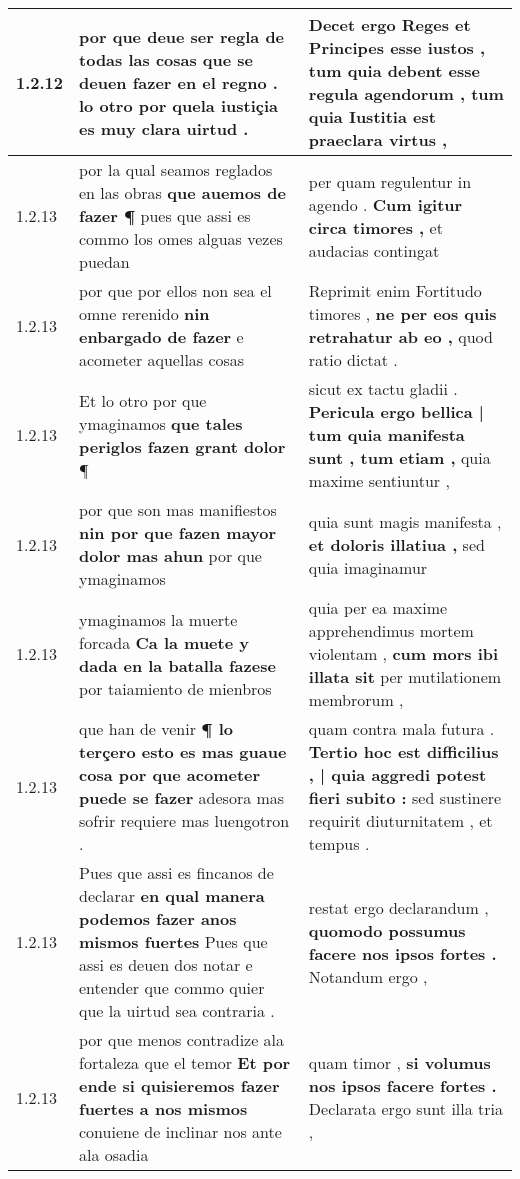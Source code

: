 \begin{tabular}{|p{1cm}|p{6.5cm}|p{6.5cm}|}
1.2.12 & por que deue ser regla de todas las cosas \textbf{ que se deuen fazer en el regno . } lo otro por quela iustiçia es muy clara uirtud . & Decet ergo Reges et Principes esse iustos , \textbf{ tum quia debent esse regula agendorum , } tum quia Iustitia est praeclara virtus , \\\hline
1.2.13 & por la qual seamos reglados en las obras \textbf{ que auemos de fazer ¶ } pues que assi es commo los omes alguas vezes puedan & per quam regulentur in agendo . \textbf{ Cum igitur circa timores , } et audacias contingat \\\hline
1.2.13 & por que por ellos non sea el omne rerenido \textbf{ nin enbargado de fazer } e acometer aquellas cosas & Reprimit enim Fortitudo timores , \textbf{ ne per eos quis retrahatur ab eo , } quod ratio dictat . \\\hline
1.2.13 & Et lo otro por que ymaginamos \textbf{ que tales periglos fazen grant dolor } ¶ & sicut ex tactu gladii . \textbf{ Pericula ergo bellica | tum quia manifesta sunt , tum etiam , } quia maxime sentiuntur , \\\hline
1.2.13 & por que son mas manifiestos \textbf{ nin por que fazen mayor dolor mas ahun } por que ymaginamos & quia sunt magis manifesta , \textbf{ et doloris illatiua , } sed quia imaginamur \\\hline
1.2.13 & ymaginamos la muerte forcada \textbf{ Ca la muete y dada en la batalla fazese } por taiamiento de mienbros & quia per ea maxime apprehendimus mortem violentam , \textbf{ cum mors ibi illata sit } per mutilationem membrorum , \\\hline
1.2.13 & que han de venir \textbf{ ¶ lo terçero esto es mas guaue cosa por que acometer puede se fazer } adesora mas sofrir requiere mas luengotron . & quam contra mala futura . \textbf{ Tertio hoc est difficilius , | quia aggredi potest fieri subito : } sed sustinere requirit diuturnitatem , et tempus . \\\hline
1.2.13 & Pues que assi es fincanos de declarar \textbf{ en qual manera podemos fazer anos mismos fuertes } Pues que assi es deuen dos notar e entender que commo quier que la uirtud sea contraria . & restat ergo declarandum , \textbf{ quomodo possumus facere nos ipsos fortes . } Notandum ergo , \\\hline
1.2.13 & por que menos contradize ala fortaleza que el temor \textbf{ Et por ende si quisieremos fazer fuertes a nos mismos } conuiene de inclinar nos ante ala osadia & quam timor , \textbf{ si volumus nos ipsos facere fortes . } Declarata ergo sunt illa tria , \\\hline

\end{tabular}
